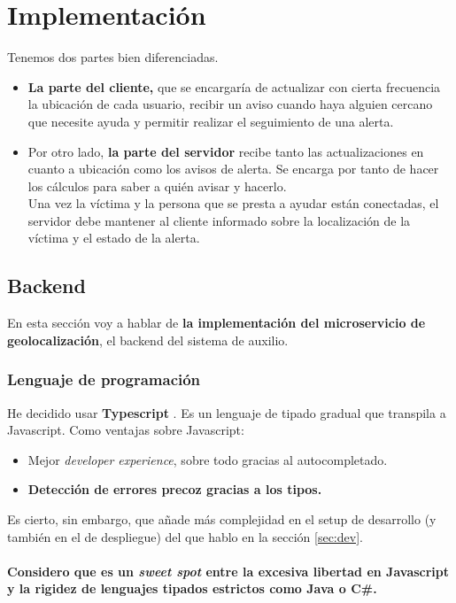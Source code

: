 \chapter{Implementación}

Tenemos dos partes bien diferenciadas.
\begin{itemize}
	\item  \textbf{La parte del cliente,} que se encargaría de actualizar con cierta frecuencia
la ubicación de cada usuario, recibir un aviso cuando haya alguien cercano que necesite ayuda y permitir realizar el seguimiento de una alerta.
\item Por otro lado, \textbf{la parte del servidor} recibe tanto las actualizaciones en cuanto a ubicación como 
los avisos de alerta. Se encarga por tanto de hacer los cálculos para saber a quién avisar y hacerlo. \\
Una vez la víctima y la persona que se presta a ayudar están conectadas, el servidor debe mantener
al cliente informado sobre la localización de la víctima y el estado de la alerta.
\end{itemize}

\section{Backend}

En esta sección voy a hablar de \textbf{la implementación del microservicio de geolocalización}, el backend del sistema de auxilio.
\subsection{Lenguaje de programación}
He decidido usar \textbf{Typescript} \cite{typescript}. Es un lenguaje de tipado gradual que transpila a Javascript.
Como ventajas sobre Javascript:
\begin{itemize}
	\item Mejor \textit{developer experience}, sobre todo gracias al autocompletado.
	\item \textbf{Detección de errores precoz gracias a los tipos.}
\end{itemize}
Es cierto, sin embargo, que añade más complejidad en el setup de desarrollo (y también en el de despliegue) del que hablo en la sección \ref{sec:dev}. \\ \\
\textbf{Considero que es un \textit{sweet spot} entre la excesiva libertad en Javascript y la rigidez de lenguajes tipados estrictos como Java o C\#.} \\ \\

